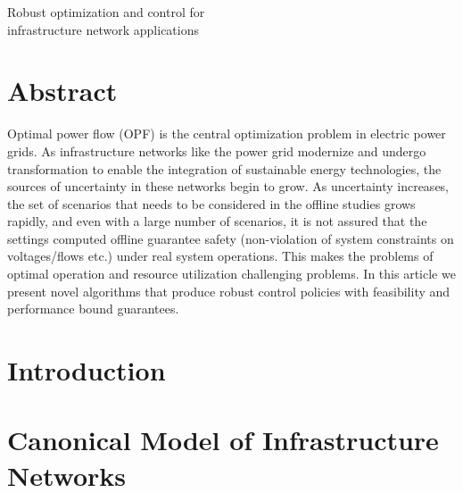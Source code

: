 \documentclass[11pt]{article}
\theoremstyle{plain}
\theoremstyle{definition}
\theoremstyle{remark}
\begin{document}
\begin{center}
\Large Robust optimization and control for \\ infrastructure network applications
\end{center}

\section*{Abstract}

Optimal power flow (OPF) is the central optimization problem in electric power grids. As infrastructure networks like the power grid modernize and undergo transformation to enable the integration of sustainable energy technologies, the sources of uncertainty in these networks begin to grow. As uncertainty increases, the set of scenarios that needs to be considered in the offline studies grows rapidly, and even with a large number of scenarios, it is not assured that the settings computed offline guarantee safety (non-violation of system constraints on voltages/flows etc.) under real system operations. This makes the problems of optimal operation and resource utilization challenging problems. In this article we present novel algorithms that produce robust control policies with feasibility and performance bound guarantees.

\section{Introduction}

\section{Canonical Model of Infrastructure Networks}
\end{document}

